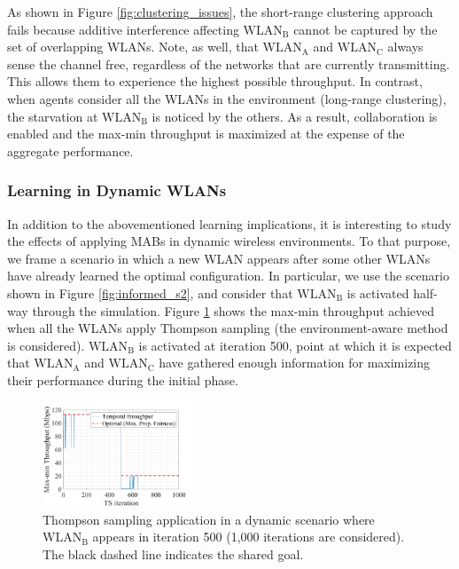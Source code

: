 \documentclass[preprint,12pt]{elsarticle}
\begin{document}
As shown in Figure \ref{fig:clustering_issues}, the short-range clustering approach fails because additive interference affecting $\text{WLAN}_\text{B}$ cannot be captured by the set of overlapping WLANs. Note, as well, that $\text{WLAN}_\text{A}$ and $\text{WLAN}_\text{C}$ always sense the channel free, regardless of the networks that are currently transmitting. This allows them to experience the highest possible throughput. In contrast, when agents consider all the WLANs in the environment (long-range clustering), the starvation at $\text{WLAN}_\text{B}$ is noticed by the others. As a result, collaboration is enabled and the max-min throughput is maximized at the expense of the aggregate performance.

\subsubsection{Learning in Dynamic WLANs}

In addition to the abovementioned learning implications, it is interesting to study the effects of applying MABs in dynamic wireless environments. To that purpose, we frame a scenario in which a new WLAN appears after some other WLANs have already learned the optimal configuration. In particular, we use the scenario shown in Figure \ref{fig:informed_s2}, and consider that $\text{WLAN}_\text{B}$ is activated half-way through the simulation. Figure \ref{fig:dynamic_wlan} shows the max-min throughput achieved when all the WLANs apply Thompson sampling (the environment-aware method is considered). $\text{WLAN}_\text{B}$ is activated at iteration 500, point at which it is expected that $\text{WLAN}_\text{A}$ and $\text{WLAN}_\text{C}$ have gathered enough information for maximizing their performance during the initial phase.

\begin{figure}[h!]
	\centering   		
	\includegraphics[width=0.4\textwidth]{max_min_tpt_1_4}
	\caption{Thompson sampling application in a dynamic scenario where $\text{WLAN}_\text{B}$ appears in iteration 500 (1,000 iterations are considered). The black dashed line indicates the shared goal.}
	\label{fig:dynamic_wlan}
\end{figure}   	
\end{document}
